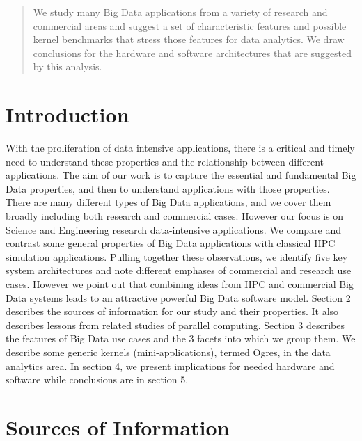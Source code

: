 \documentclass{acm_proc_article-sp}
\begin{document}
\maketitle
\begin{abstract}
We study many Big Data applications from a variety of research and commercial areas and suggest a set of characteristic features and possible kernel benchmarks that stress those features for data analytics. We draw conclusions for the hardware and software architectures that are suggested by this analysis.
\end{abstract}


\section{Introduction}
With the proliferation of data intensive applications, there is a critical and timely need to understand these properties and the relationship between different applications. The aim of our work is to capture the essential and fundamental Big Data properties, and then to understand applications with those properties. 
There are many different types of Big Data applications, and we cover them broadly including both research and commercial cases. However our focus is on Science and Engineering research data-intensive applications. We compare and contrast some general properties of Big Data applications with classical HPC simulation applications.  Pulling together these observations, we identify five key system architectures and note different emphases of commercial and research use cases. However we point out that combining ideas from HPC and commercial Big Data systems leads to an attractive powerful Big Data software model.
Section 2 describes the sources of information for our study and their properties. It also describes lessons from related studies of parallel computing. Section 3 describes the features of Big Data use cases and the 3 facets into which we group them. We describe some generic kernels (mini-applications), termed Ogres, in the data analytics area. In section 4, we present implications for needed hardware and software while conclusions are in section 5.

\section{Sources of Information}
\end{document}

